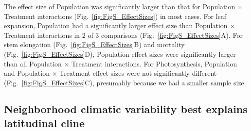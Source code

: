 \documentclass[11pt, oneside]{article}
\begin{document}
The effect size of Population was significantly larger than that for Population $\times$ Treatment interactions (Fig.~\ref{fig:FigS_EffectSizes}) in most cases. For leaf expansion, Population had a significantly larger effect size than Population $\times$ Treatment interactions in 2 of 3 comparisons (Fig.~\ref{fig:FigS_EffectSizes}A). For stem elongation (Fig.~\ref{fig:FigS_EffectSizes}B) and mortality (Fig.~\ref{fig:FigS_EffectSizes}D), Population effect sizes were significantly larger than all Population $\times$ Treatment interactions. For Photosynthesis, Population and Population $\times$ Treatment effect sizes were not significantly different (Fig.~\ref{fig:FigS_EffectSizes}C), presumably because we had a smaller sample size.

\subsection*{Neighborhood climatic variability best explains latitudinal cline}
\end{document}
